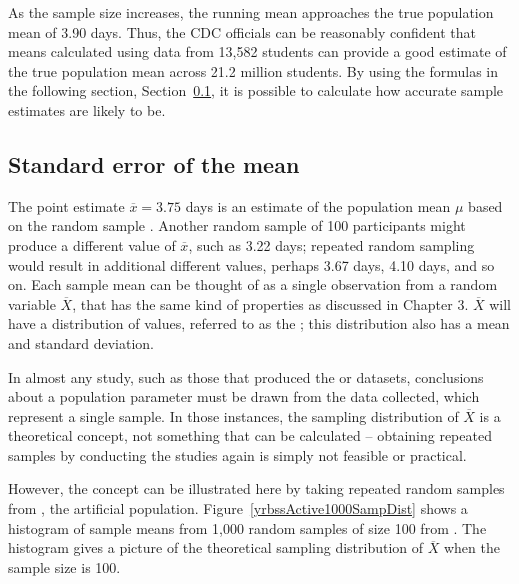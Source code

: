 \begin{spacing}{1.5}

As the sample size increases, the running mean approaches the true population mean of 3.90 days. Thus, the CDC officials can be reasonably confident that means calculated using data from 13,582 students can provide a good estimate of the true population mean across 21.2 million students. By using the formulas in the following section, Section~\ref{seOfTheMean}, it is possible to calculate how accurate sample estimates are likely to be.

\subsection{Standard error of the mean}
\label{seOfTheMean}

The point estimate $\overline{x} = 3.75$ days is an estimate of the population mean $\mu$ based on the random sample . Another random sample of 100 participants might produce a different value of $\overline{x}$, such as 3.22 days; repeated random sampling would result in additional different values, perhaps 3.67 days, 4.10 days, and so on. Each sample mean can be thought of as a single observation from a random variable $\overline{X}$, that has the same kind of properties as discussed in Chapter 3. $\overline{X}$ will have a distribution of values, referred to as the ; this distribution also has a mean and standard deviation.

In almost any study, such as those that produced the  or  datasets, conclusions about a population parameter must be drawn from the data collected, which represent a single sample. In those instances, the sampling distribution of $\overline{X}$ is a theoretical concept, not something that can be calculated -- obtaining repeated samples by conducting the studies again is simply not feasible or practical.

However, the concept can be illustrated here by taking repeated random samples from , the artificial population. Figure~\ref{yrbssActive1000SampDist} shows a histogram of sample means from 1,000 random samples of size 100 from . The histogram gives a picture of the theoretical sampling distribution of $\overline{X}$ when the sample size is 100. 


\end{spacing}
